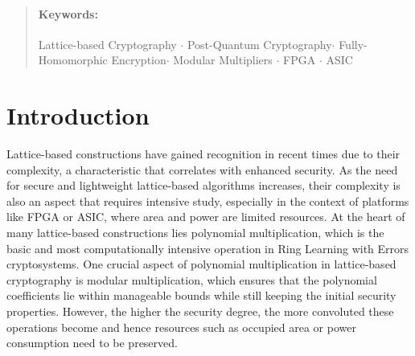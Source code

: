 \documentclass[11pt,
  titlepage=false,
  abstract=on,
]{scrreprt}
\begin{document}
\begin{abstract}



\paragraph*{Keywords:}
Lattice-based Cryptography $\cdot$
Post-Quantum Cryptography$\cdot$
Fully-Homomorphic Encryption$\cdot$
Modular Multipliers $\cdot$
FPGA $\cdot$
ASIC
\end{abstract}

\clearpage



\section{Introduction}
\label{sec:introduction}

Lattice-based constructions have gained recognition in recent times due to their complexity, a characteristic that correlates with enhanced security.
As the need for secure and lightweight lattice-based algorithms increases, their complexity is also an aspect that requires intensive study, especially
in the context of platforms like FPGA or ASIC, where area and power are limited resources.
At the heart of many lattice-based constructions lies polynomial multiplication, which is the basic and most computationally intensive operation in 
Ring Learning with Errors cryptosystems. One crucial aspect of polynomial multiplication in lattice-based cryptography is modular multiplication, which 
ensures that the polynomial coefficients lie within manageable bounds while still keeping the initial security properties. However, the higher the security 
degree, the more convoluted these operations become and hence resources such as occupied area or power consumption need to be preserved.
\end{document}
